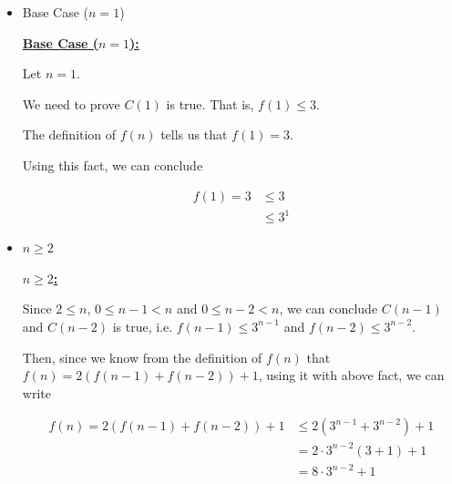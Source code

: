 \documentclass[12pt]{article}
\begin{document}
\begin{itemize}
\begin{mdframed}
\begin{itemize}
            \item Base Case ($n = 1$)

            \begin{mdframed}

            \underline{\textbf{Base Case ($n = 1$):}}

            \bigskip

            Let $n = 1$.

            \bigskip

            We need to prove $C(1)$ is true. That is, $f(1) \leq 3$.

            \bigskip

            The definition of $f(n)$ tells us that $f(1) = 3$.

            \bigskip

            Using this fact, we can conclude

            \begin{align}
                f(1) = 3 &\leq 3\\
                &\leq 3^1
            \end{align}

            \end{mdframed}

            \item $n \geq 2$

            \begin{mdframed}
            \underline{\textbf{$n \geq 2 $:}}

            \bigskip

            Since $2 \leq n$, $0 \leq n - 1 < n$ and $0 \leq n - 2 < n$, we can
            conclude $C(n-1)$ and $C(n-2)$ is true, i.e. $f(n-1) \leq 3^{n-1}$ and
            $f(n-2) \leq 3^{n-2}$.

            \bigskip

            Then, since we know from the definition of $f(n)$ that $f(n) = 2(f(n-1) + f(n-2)) + 1$,
            using it with above fact, we can write

            \bigskip

            \begin{align}
                f(n) = 2(f(n-1) + f(n-2)) + 1 &\leq 2(3^{n-1} + 3^{n-2}) + 1\\
                &= 2 \cdot 3^{n-2} (3+1) + 1\\
                &= 8 \cdot 3^{n-2} + 1
            \end{align}


\end{mdframed}
\end{itemize}
\end{mdframed}
\end{itemize}
\end{document}
